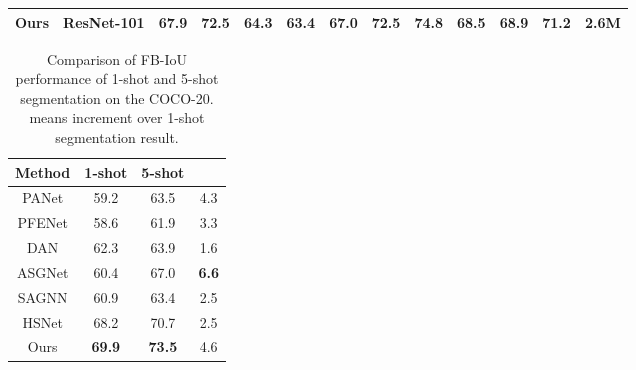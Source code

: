 \documentclass[lettersize,journal]{IEEEtran}
\begin{document}
\begin{table*}
\begin{tabular}{c|c|ccccc|ccccc|c}
\hline
Ours                    & ResNet-101                 & \textbf{67.9}                               & \textbf{72.5}                                        & \textbf{64.3}                              & \textbf{63.4}                      & \textbf{67.0} & \textbf{72.5}                               & \textbf{74.8}                               & \textbf{68.5}                                        & \textbf{68.9}                      & \textbf{71.2}             & \textbf{2.6M}                                                                  \\ 
\hline
\end{tabular}
\end{table*}


\begin{table}
\centering
\caption{Comparison of FB-IoU performance of 1-shot and 5-shot segmentation on the COCO-20.  means increment over 1-shot segmentation result.  \label{tab4}}
\begin{tabular}{c|c|c|c} 
\hline
Method & 1-shot & 5-shot &   \\ 
\hline
PANet \cite{RN22} & 59.2   & 63.5   & 4.3                                                           \\
PFENet \cite{RN6} & 58.6   & 61.9   & 3.3                                                           \\
DAN \cite{RN13}    & 62.3   & 63.9   & 1.6                                                           \\
ASGNet \cite{RN9} & 60.4   & 67.0   & \textbf{6.6}                                                           \\
SAGNN \cite{RN83}  & 60.9   & 63.4   & 2.5                                                          \\ 
HSNet \cite{RN85}  & 68.2   & 70.7   & 2.5                                                           \\ 
\hline
Ours   & \textbf{69.9}      & \textbf{73.5}      & 4.6                                                             \\
\hline
\end{tabular}
\end{table}
\end{document}
